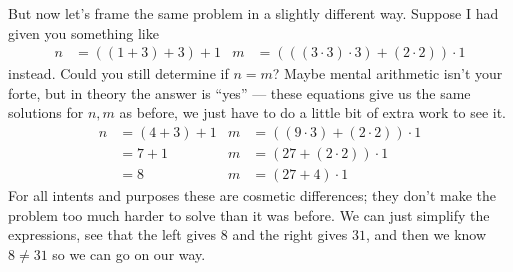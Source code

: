 But now let's frame the same problem in a slightly different way.
Suppose I had given you something like
\begin{align*}
  n &= ((1 + 3) + 3) + 1
  & m &= (((3 \cdot 3) \cdot 3) + (2 \cdot 2)) \cdot 1
\end{align*}
instead. Could you still determine if $n = m$? Maybe mental arithmetic
isn't your forte, but in theory the answer is ``yes'' --- these
equations give us the same solutions for $n,m$ as before, we just have
to do a little bit of extra work to see it.
\begin{align*}
  n
  &= (4 + 3) + 1
  &
    m
  &= ((9 \cdot 3) + (2 \cdot 2)) \cdot 1 \\
  &= 7 + 1
  &
    m
  &= (27 + (2 \cdot 2)) \cdot 1 \\
  &= 8
  &
    m
    &= (27 + 4) \cdot 1
\end{align*}
For all intents and purposes these are cosmetic differences; they
don't make the problem too much harder to solve than it was before. We
can just simplify the expressions, see that the left gives $8$ and the
right gives $31$, and then we know $8 \neq 31$ so we can go on our
way.

